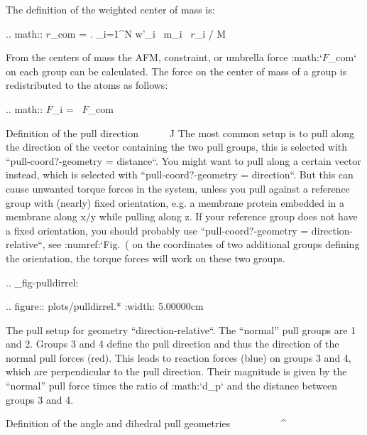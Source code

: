 The definition of the weighted center of mass is:

.. math:: {\mbox{\boldmath ${r}$}}_{com} = \left. \sum_{i=1}^N w'_i \, m_i \, {\mbox{\boldmath ${r}$}}_i \right/ M

From the centers of mass the AFM, constraint, or umbrella force
:math:`{\mbox{\boldmath ${F}$}}_{\!com}` on each group can be
calculated. The force on the center of mass of a group is redistributed
to the atoms as follows:

.. math:: {\mbox{\boldmath ${F}$}}_{\!i} =  \, {\mbox{\boldmath ${F}$}}_{\!com}

Definition of the pull direction
^^^^^^^^^^^^^^^^^^^^^^^^^^^^^^^^

The most common setup is to pull along the direction of the vector
containing the two pull groups, this is selected with
``pull-coord?-geometry = distance``. You might want to pull
along a certain vector instead, which is selected with
``pull-coord?-geometry = direction``. But this can cause
unwanted torque forces in the system, unless you pull against a
reference group with (nearly) fixed orientation, e.g. a membrane protein
embedded in a membrane along x/y while pulling along z. If your
reference group does not have a fixed orientation, you should probably
use ``pull-coord?-geometry = direction-relative``, see
:numref:`Fig. (%
on the coordinates of two additional groups defining the orientation,
the torque forces will work on these two groups.

.. _fig-pulldirrel:

.. figure:: plots/pulldirrel.*
   :width: 5.00000cm

   The pull setup for geometry ``direction-relative``. The
   “normal” pull groups are 1 and 2. Groups 3 and 4 define the pull
   direction and thus the direction of the normal pull forces (red).
   This leads to reaction forces (blue) on groups 3 and 4, which are
   perpendicular to the pull direction. Their magnitude is given by the
   “normal” pull force times the ratio of :math:`d_p` and the distance
   between groups 3 and 4.

Definition of the angle and dihedral pull geometries
^^^^^^^^^^^^^^^^^^^^^^^^^^^^^^^^^^^^^^^^^^^^^^^^^^^^

